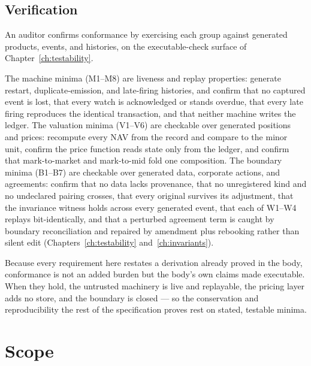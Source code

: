 \documentclass[11pt,a4paper]{article}
\begin{document}
\subsection{Verification}

An auditor confirms conformance by exercising each group against generated products,
events, and histories, on the executable-check surface of Chapter~\ref{ch:testability}.

The machine minima (M1--M8) are liveness and replay properties: generate restart,
duplicate-emission, and late-firing histories, and confirm that no captured event is lost, that
every watch is acknowledged or stands overdue, that every late firing reproduces the
identical transaction, and that neither machine writes the ledger. The valuation minima
(V1--V6) are checkable over generated positions and prices: recompute every NAV from the
record and compare to the minor unit, confirm the price function reads state only from the
ledger, and confirm that mark-to-market and mark-to-mid fold one composition. The boundary
minima (B1--B7) are checkable over generated data, corporate actions, and agreements:
confirm that no
data lacks provenance, that no unregistered kind and no undeclared pairing crosses, that
every original survives its adjustment, that the invariance witness holds across every
generated event, that each of W1--W4 replays bit-identically, and that a perturbed
agreement term is caught by boundary reconciliation and repaired by amendment plus
rebooking rather than silent edit
(Chapters~\ref{ch:testability} and~\ref{ch:invariants}).

Because every requirement here restates a derivation already proved in the body,
conformance is not an added burden but the body's own claims made executable. When they
hold, the untrusted machinery is live and replayable, the pricing layer adds no store, and
the boundary is closed --- so the conservation and reproducibility the rest of the
specification proves rest on stated, testable minima.

\section{Scope}\label{ch:scope}
\end{document}
